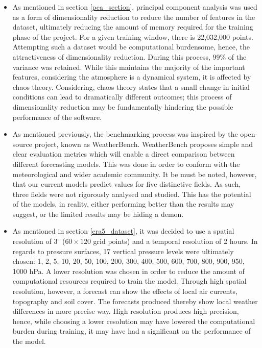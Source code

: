 \begin{itemize}
    \item As mentioned in section \ref{pca_section}, principal component analysis was used as a form of dimensionality reduction to reduce the number of features in the dataset, ultimately reducing the amount of memory required for the training phase of the project. For a given training window, there is 22,032,000 points. Attempting such a dataset would be computational burdensome, hence, the attractiveness of dimensionality reduction. During this process, 99\% of the variance was retained. While this maintains the majority of the important features, considering the atmosphere is a dynamical system, it is affected by chaos theory. Considering, chaos theory states that a small change in initial conditions can lead to dramatically different outcomes; this process of dimensionality reduction may be fundamentally hindering the possible performance of the software. 
    \item As mentioned previously, the benchmarking process was inspired by the open-source project, known as WeatherBench. WeatherBench proposes simple and clear evaluation metrics which will enable a direct comparison between different forecasting models\cite{rasp2020weatherbench}. This was done in order to conform with the meteorological and wider academic community. It be must be noted, however, that our current models predict values for five distinctive fields. As such, three fields were not rigorously analysed and studied. This has the potential of the models, in reality, either performing better than the results may suggest, or the limited results may be hiding a demon. 
    \item As mentioned in section \ref{era5_dataset}, it was decided to use a spatial resolution of $3^{\circ}$ ($60 \times 120$ grid points) and a temporal resolution of 2 hours. In regards to pressure surfaces, 17 vertical pressure levels were ultimately chosen:  1, 2, 5, 10, 20, 50, 100, 200, 300, 400, 500, 600, 700, 800, 900,  950, 1000 hPa. A lower resolution was chosen in order to reduce the amount of computational resources required to train the model. Through high spatial resolution, however, a forecast can show the effects of local air currents, topography and soil cover. The forecasts produced thereby show local weather differences in more precise way\cite{res}. High resolution produces high precision, hence, while choosing a lower resolution may have lowered the computational burden during training, it may have had a significant on the performance of the model.
\end{itemize}

